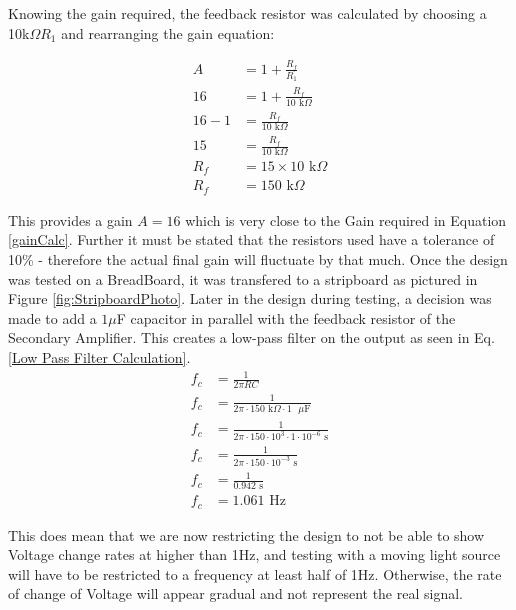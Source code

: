 Knowing the gain required, the feedback resistor was calculated by choosing a 10k$\Omega R_1$ and rearranging the gain equation:

\begin{equation} \label{Feedback Resistor Calculation}
  \begin{split}
  A &= 1 + \frac{R_f}{R_1} \\
  16 &= 1 + \frac{R_f}{10\text{ k}\Omega} \\
  16 - 1 &= \frac{R_f}{10\text{ k}\Omega} \\
  15 &= \frac{R_f}{10\text{ k}\Omega} \\
  R_f &= 15 \times 10\text{ k}\Omega \\
  R_f &= 150\text{ k}\Omega
  \end{split}
\end{equation}

This provides a gain $A= 16$ which is very close to the Gain required in Equation \ref{gainCalc}. Further it must be stated that the resistors used have a tolerance of 10\% - therefore the actual final gain will fluctuate by that much. Once the design was tested on a BreadBoard, it was transfered to a stripboard as pictured in Figure \ref{fig:StripboardPhoto}.
Later in the design during testing, a decision was made to add a $1\mu$F capacitor in parallel with the feedback resistor of the Secondary Amplifier. This creates a low-pass filter on the output as seen in Eq. \ref{Low Pass Filter Calculation}.
\begin{equation} \label{Low Pass Filter Calculation}
  \begin{split}
    f_c &= \frac{1}{2\pi RC} \\
    f_c &= \frac{1}{2\pi \cdot 150\text{ k}\Omega \cdot 1\text{ }\mu\text{F}} \\
    f_c &= \frac{1}{2\pi \cdot 150 \cdot 10^3 \cdot 1 \cdot 10^{-6}\text{ s}} \\
    f_c &= \frac{1}{2\pi \cdot 150 \cdot 10^{-3}\text{ s}} \\
    f_c &= \frac{1}{0.942\text{ s}} \\
    f_c &= 1.061\text{ Hz}
  \end{split}
\end{equation}

This does mean that we are now restricting the design to not be able to show Voltage change rates at higher than 1Hz, and testing with a moving light source will have to be restricted to a frequency at least half of 1Hz. Otherwise, the rate of change of Voltage will appear gradual and not represent the real signal. 

